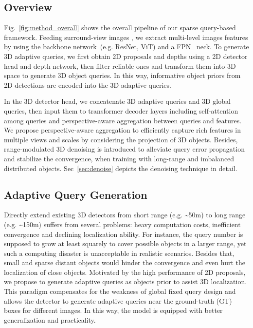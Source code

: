 \documentclass[letterpaper]{article} \usepackage{aaai24}
\begin{document}
\subsection{Overview}
Fig.~\ref{fig:method_overall} shows the overall pipeline of our sparse query-based framework. 
Feeding surround-view images , we extract  multi-level images features  by using the backbone network~(e.g. ResNet, ViT) and a FPN~\cite{lin2017feature} neck. 
To generate 3D adaptive queries, we first obtain 2D proposals and depths using a 2D detector head and depth network, then filter reliable ones and transform them into 3D space to generate 3D object queries. In this way, informative object priors from 2D detections are encoded into the 3D adaptive queries.

In the 3D detector head, we concatenate 3D adaptive queries and 3D global queries, then input them to transformer decoder layers including self-attention among queries and perspective-aware aggregation between queries and features. We propose perspective-aware aggregation to efficiently capture rich features in multiple views and scales by considering the projection of 3D objects. Besides, range-modulated 3D denoising is introduced to alleviate query error propagation and stabilize the convergence, when training with long-range and imbalanced distributed objects. Sec~\ref{sec:denoise} depicts the denoising technique in detail.

\subsection{Adaptive Query Generation}
Directly extend existing 3D detectors from short range (e.g. \textasciitilde50m) to long range (e.g. \textasciitilde150m) suffers from several problems: heavy computation costs, inefficient convergence and declining localization ability. For instance, the query number is supposed to grow at least squarely to cover possible objects in a larger range, yet such a computing disaster is unacceptable in realistic scenarios. Besides that, small and sparse distant objects would hinder the convergence and even hurt the localization of close objects. 
Motivated by the high performance of 2D proposals, we propose to generate adaptive queries as objects prior to assist 3D localization. This paradigm compensates for the weakness of global fixed query design and allows the detector to generate adaptive queries near the ground-truth (GT) boxes for different images. In this way, the model is equipped with better generalization and practicality.
\end{document}
